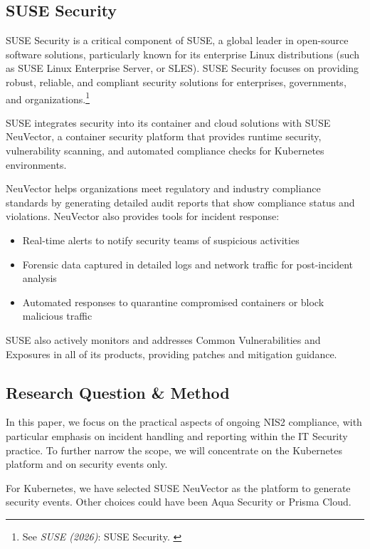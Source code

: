 \subsection{SUSE Security}\label{neuvector}

SUSE Security is a critical component of SUSE, a global leader in open-source software solutions, particularly known for its enterprise Linux distributions (such as SUSE Linux Enterprise Server, or SLES). SUSE Security focuses on providing robust, reliable, and compliant security solutions for enterprises, governments, and organizations.\footnote{See \textit{SUSE (2026)}: SUSE Security. \cite{suseSec}}

SUSE integrates security into its container and cloud solutions with SUSE NeuVector, a container security platform that provides runtime security, vulnerability scanning, and automated compliance checks for Kubernetes environments.

NeuVector helps organizations meet regulatory and industry compliance standards by generating detailed audit reports that show compliance status and violations. NeuVector also provides tools for incident response:

\begin{itemize}
    \item Real-time alerts to notify security teams of suspicious activities
    \item Forensic data captured in detailed logs and network traffic for post-incident analysis
    \item Automated responses to quarantine compromised containers or block malicious traffic
\end{itemize}

SUSE also actively monitors and addresses Common Vulnerabilities and Exposures in all of its products, providing patches and mitigation guidance.

\subsection{Research Question \& Method}

In this paper, we focus on the practical aspects of ongoing NIS2 compliance, with particular emphasis on incident handling and reporting within the IT Security practice. To further narrow the scope, we will concentrate on the Kubernetes platform and on security events only.

For Kubernetes, we have selected SUSE NeuVector as the platform to generate security events. Other choices could have been Aqua Security or Prisma Cloud.


